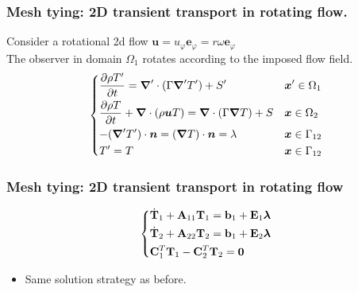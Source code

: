 \documentclass[10pt,xcolor=dvipsnames]{beamer}
\begin{document}
\begin{frame}[t]

\frametitle{Mesh tying: 2D transient transport in rotating flow.}

\justifying Consider a rotational 2d flow $ \boldsymbol u = u_\varphi \boldsymbol e_\varphi = r\omega\boldsymbol e_\varphi$\\
 \justifying The observer in domain $\Omega_1$ rotates according to the imposed flow field.\\
 \vspace{1cm}
\begin{equation*}
 \begin{dcases}
    \frac{\partial\rho T^\prime}{\partial t}  = \boldsymbol\nabla^\prime\cdot(\Gamma \boldsymbol \nabla^\prime T^\prime )+ S^\prime & \boldsymbol x^\prime\in \Omega_1 \\
    \frac{\partial\rho T}{\partial t} + \boldsymbol \nabla\cdot(\rho \boldsymbol u T) = \boldsymbol\nabla\cdot(\Gamma \boldsymbol \nabla T) + S & \boldsymbol x\in \Omega_2\\
   - (\boldsymbol \nabla^\prime T^\prime )\cdot \boldsymbol n = (\boldsymbol \nabla T)\cdot\boldsymbol n = \lambda & \boldsymbol x\in\Gamma_{12}\\
    T^\prime = T & \boldsymbol x\in\Gamma_{12}
 \end{dcases}
\end{equation*}

\end{frame}

\begin{frame}
  \frametitle{Mesh tying: 2D transient transport in rotating flow}
\begin{equation*}
 \begin{dcases}
   \dot{\mathbf T}_1 + \mathbf A_{11} \mathbf T_1 = \mathbf b_1 + \mathbf E_1 \boldsymbol \lambda \\
   \dot{\mathbf T}_2 + \mathbf A_{22}\mathbf T_2 = \mathbf b_1 + \mathbf E_2\boldsymbol\lambda  \\
  \mathbf C_1^T \mathbf T_1 - \mathbf C_2^T \mathbf T_2 = \mathbf 0
 \end{dcases}
 \end{equation*}
 \begin{itemize}
 \item Same solution strategy as before.
\end{itemize}
\end{frame}
\end{document}
